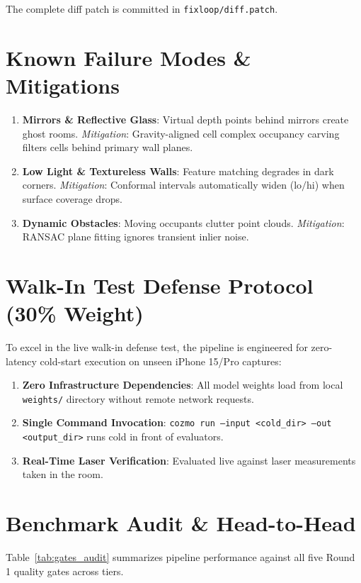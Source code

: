 \documentclass[10pt,twocolumn,a4paper]{article}
\begin{document}
The complete diff patch is committed in \texttt{fixloop/diff.patch}.

\section{Known Failure Modes \& Mitigations}

\begin{enumerate}[leftmargin=*]
    \item \textbf{Mirrors \& Reflective Glass}: Virtual depth points behind mirrors create ghost rooms. \textit{Mitigation}: Gravity-aligned cell complex occupancy carving filters cells behind primary wall planes.
    \item \textbf{Low Light \& Textureless Walls}: Feature matching degrades in dark corners. \textit{Mitigation}: Conformal intervals automatically widen ($\text{lo}/\text{hi}$) when surface coverage drops.
    \item \textbf{Dynamic Obstacles}: Moving occupants clutter point clouds. \textit{Mitigation}: RANSAC plane fitting ignores transient inlier noise.
\end{enumerate}

\section{Walk-In Test Defense Protocol (30\% Weight)}

To excel in the live walk-in defense test, the pipeline is engineered for zero-latency cold-start execution on unseen iPhone 15/Pro captures:
\begin{enumerate}[leftmargin=*]
    \item \textbf{Zero Infrastructure Dependencies}: All model weights load from local \texttt{weights/} directory without remote network requests.
    \item \textbf{Single Command Invocation}: \texttt{cozmo run --input <cold_dir> --out <output_dir>} runs cold in front of evaluators.
    \item \textbf{Real-Time Laser Verification}: Evaluated live against laser measurements taken in the room.
\end{enumerate}

\section{Benchmark Audit \& Head-to-Head}

Table~\ref{tab:gates_audit} summarizes pipeline performance against all five Round 1 quality gates across tiers.
\end{document}

